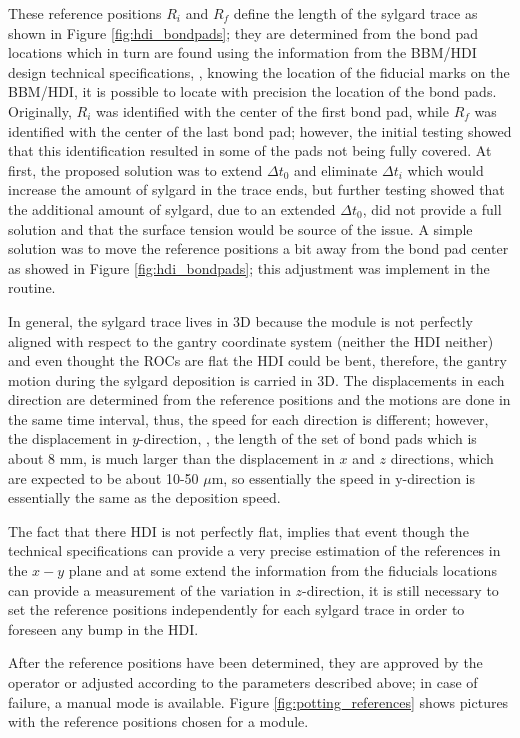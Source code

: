These reference positions $R_i$ and $R_f$ define the length of the sylgard trace  as shown in Figure \ref{fig:hdi_bondpads}; they are determined from the bond pad locations which in turn are found using the information from the BBM/HDI design technical specifications, \ie, knowing the location of the fiducial marks on the BBM/HDI, it is possible to locate with precision the location of the bond pads. Originally, $R_i$ was identified with the center of the first bond pad, while $R_f$ was identified with the center of the last bond pad; however, the initial testing showed that this identification resulted in some of the pads not being fully covered. At first, the proposed solution was to extend $\Delta t_0$ and eliminate $\Delta t_i$ which would increase the amount of sylgard in the trace ends, but further testing showed that the additional amount of sylgard, due to an extended $\Delta t_0$, did not provide a full solution and that the surface tension would be source of the issue. A simple solution was to move the reference positions a bit away from the bond pad center as showed in Figure \ref{fig:hdi_bondpads}; this adjustment was implement in the routine. 

In general, the sylgard trace lives in 3D because the module is not perfectly aligned with respect to the gantry coordinate system (neither the HDI neither) and even thought the ROCs are flat the HDI could be bent, therefore, the gantry motion during the sylgard deposition is carried in 3D. The displacements in each direction are determined from the reference positions and the motions are done in the same time interval, thus, the speed for each direction is different; however, the displacement in $y$-direction, \ie, the length of the set of bond pads which is about 8 mm, is much larger than the displacement in $x$ and $z$ directions, which are expected to be about 10-50 $\mu$m, so essentially the speed in y-direction is essentially the same as the deposition speed.

The fact that there HDI is not perfectly flat, implies that event though the technical specifications can provide a very precise estimation of the references in the $x-y$ plane and at some extend the information from the fiducials locations can provide a measurement of the variation in $z$-direction, it is still necessary to set the reference positions independently for each sylgard trace in order to foreseen any bump in the HDI.

After the reference positions have been determined, they are approved by the operator or adjusted according to the parameters described above; in case of failure, a manual mode is available. Figure \ref{fig:potting_references} shows pictures with the reference positions chosen for a module.        

